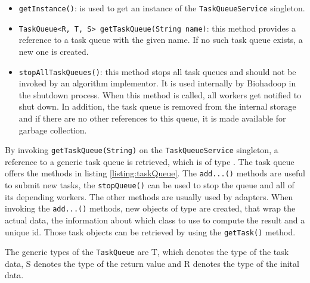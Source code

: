   
  
  \begin{itemize}
    \item \texttt{getInstance()}: is used to get an instance of the \texttt{TaskQueueService} singleton.
    \item \texttt{TaskQueue<R, T, S> getTaskQueue(String name)}: this method provides a reference to a task queue with the given name. If no such task queue exists, a new one is created.
    \item \texttt{stopAllTaskQueues()}: this method stops all task queues and should not be invoked by an algorithm implementor. It is used internally by Biohadoop in the shutdown process. When this method is called, all workers get notified to shut down. In addition, the task queue is removed from the internal storage and if there are no other references to this queue, it is made available for garbage collection.
  \end{itemize}

  By invoking \texttt{getTaskQueue(String)} on the \texttt{TaskQueueService} singleton, a reference to a generic task queue is retrieved, which is of type . The task queue offers the methods in listing \ref{listing:taskQueue}. The \texttt{add...()} methods are useful to submit new tasks, the  \texttt{stopQueue()} can be used to stop the queue and all of its depending workers. The other methods are usually used by adapters. When invoking the  \texttt{add...()} methods, new objects of type  are created, that wrap the actual data, the information about which class to use to compute the result and a unique id. Those task objects can be retrieved by using the \texttt{getTask()} method.
  
  The generic types of the \texttt{TaskQueue} are T, which denotes the type of the task data, S denotes the type of the return value and R denotes the type of the inital data.
  
  
  
